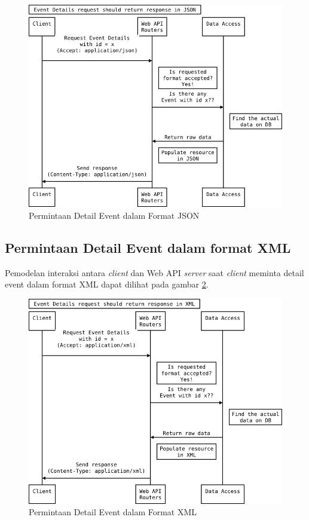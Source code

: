 \documentclass[a4paper, 12pt, oneside]{report}
\begin{document}
\begin{figure}[htp]
\centering
\includegraphics[scale=0.60]{images/event-details-request-seq-diagram-json.png}
\caption{Permintaan Detail Event dalam Format JSON}
\label{event-details-request-seq-diagram-json}
\end{figure}

\newpage

\subsection{Permintaan Detail Event dalam format XML}

\onehalfspacing Pemodelan interaksi antara \textit{client} dan Web API \textit{server} saat \textit{client} meminta detail event dalam format XML dapat dilihat pada gambar \ref{event-details-request-seq-diagram-xml}.

\begin{figure}[htp]
\centering
\includegraphics[scale=0.60]{images/event-details-request-seq-diagram-xml.png}
\caption{Permintaan Detail Event dalam Format XML}
\label{event-details-request-seq-diagram-xml}
\end{figure}
\end{document}
